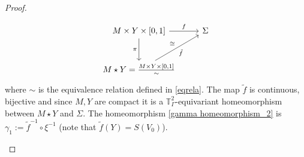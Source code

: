 \documentclass[10pt,a4paper]{amsart}
\newcommand{\T}{{\mathbb T}}
\begin{document}
\begin{proof}
\begin{itemize}
\[
\begin{tikzcd}[row sep=large]
 M \times Y \times [0,1] 
 \arrow[d,"\pi"']  \arrow[r,"f"]
 & 
\Sigma 
 \\
M \star Y = \frac{M \times Y\times[0,1]}\sim 
 \arrow[ur,"\tilde f "',"\cong"]
 & 
\end{tikzcd}
\]
where $ \sim $ is the equivalence relation defined in \eqref{eqrela}.
The map $ \tilde f $ is continuous, bijective and since $ M, Y $ are compact it is a $ \T^2_\Gamma $-equivariant homeomorphism between 
$ M \star Y $ and $ \Sigma $. The homeomorphism \eqref{gamma homeomorphism_2} is 
$ \gamma_1 := \tilde f^{-1} \circ \xi^{-1} $ (note that $ \tilde f (Y) = S(V_0) $).        
        \qedhere
        \end{itemize}
        \end{proof}
\end{document}
